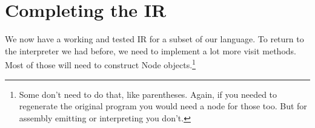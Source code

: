 \section{Completing the IR}

We now have a working and tested IR for a subset of our language.
To return to the interpreter we had before, we need to implement
a lot more visit methods. Most of those will need to construct
Node objects.\footnote{Some don't need to do that, like parentheses.
Again, if you needed to regenerate the original program you would
need a node for those too. But for assembly emitting or interpreting
you don't.}
